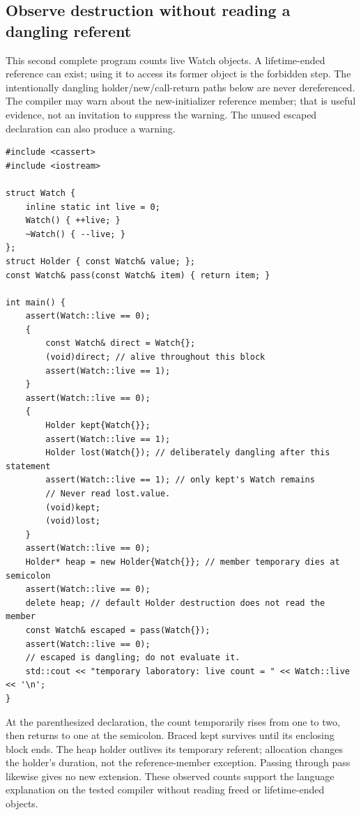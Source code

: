 \subsection{Observe destruction without reading a dangling referent}\label{01-foundations-i-ch004-observe-destruction-without-reading-a-dangling-referent}

\hypertarget{01-foundations-i-ch004-observe-destruction-without-reading-a-dangling-referent}{}

This second complete program counts live Watch objects. A lifetime-ended reference can exist; using it to access its former object is the forbidden step. The intentionally dangling holder/new/call-return paths below are never dereferenced. The compiler may warn about the new-initializer reference member; that is useful evidence, not an invitation to suppress the warning. The unused escaped declaration can also produce a warning.

\begin{verbatim}
#include <cassert>
#include <iostream>

struct Watch {
    inline static int live = 0;
    Watch() { ++live; }
    ~Watch() { --live; }
};
struct Holder { const Watch& value; };
const Watch& pass(const Watch& item) { return item; }

int main() {
    assert(Watch::live == 0);
    {
        const Watch& direct = Watch{};
        (void)direct; // alive throughout this block
        assert(Watch::live == 1);
    }
    assert(Watch::live == 0);
    {
        Holder kept{Watch{}};
        assert(Watch::live == 1);
        Holder lost(Watch{}); // deliberately dangling after this statement
        assert(Watch::live == 1); // only kept's Watch remains
        // Never read lost.value.
        (void)kept;
        (void)lost;
    }
    assert(Watch::live == 0);
    Holder* heap = new Holder{Watch{}}; // member temporary dies at semicolon
    assert(Watch::live == 0);
    delete heap; // default Holder destruction does not read the member
    const Watch& escaped = pass(Watch{});
    assert(Watch::live == 0);
    // escaped is dangling; do not evaluate it.
    std::cout << "temporary laboratory: live count = " << Watch::live << '\n';
}
\end{verbatim}

At the parenthesized declaration, the count temporarily rises from one to two, then returns to one at the semicolon. Braced kept survives until its enclosing block ends. The heap holder outlives its temporary referent; allocation changes the holder's duration, not the reference-member exception. Passing through pass likewise gives no new extension. These observed counts support the language explanation on the tested compiler without reading freed or lifetime-ended objects.

